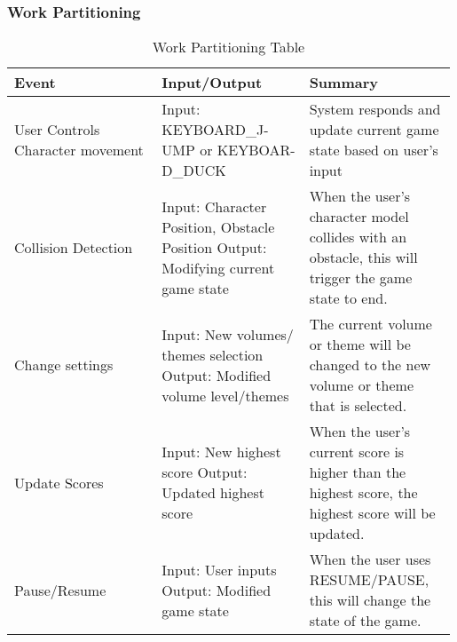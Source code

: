 \documentclass[12pt, titlepage]{article}
\begin{document}
\subsubsection{Work Partitioning}
\begin{table}[h]
    \centering
    \begin{tabular}{|p{0.33\linewidth} | p{0.33\linewidth} | p{0.33\linewidth}| }
    \hline
         Event & Input/Output & Summary \\
         \hline
         User Controls Character movement & Input: KEYBOARD\_J-UMP or KEYBOAR-D\_DUCK & System responds and update current game state  based on user's input\\
         \hline
         Collision Detection & Input: Character Position, Obstacle Position \newline  Output: Modifying current game state & When the user's character model collides with an obstacle, this will trigger the game state to end.   \\
         \hline
         Change settings & Input: New volumes/ themes selection \newline  Output: Modified volume level/themes & The current volume or theme will be changed to the new volume or theme that is selected.   \\
         \hline
         Update Scores & Input: New highest score \newline  Output: Updated highest score & When the user's current score is higher than the highest score, the highest score will be updated.\\
         \hline
         Pause/Resume & Input: User inputs \newline  Output: Modified game state & When the user uses RESUME/PAUSE, this will change the state of the game.\\
         \hline
    \end{tabular}
    \caption{Work Partitioning Table}
    \label{tab:my_label}
\end{table}
\end{document}

